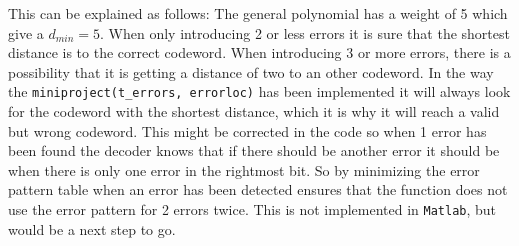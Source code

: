 \documentclass[Main]{subfiles}
\begin{document}
This can be explained as follows:
The general polynomial has a weight of 5 which give a $d_{min}=5$.
When only introducing 2 or less errors it is sure that the shortest distance is to the correct codeword.
When introducing 3 or more errors, there is a possibility that it is getting a distance of two to an other codeword.
In the way the \texttt{miniproject(t\_errors, errorloc)} has been implemented it will always look for the codeword with the shortest distance, which it is why it will reach a valid but wrong codeword.
This might be corrected in the code so when 1 error has been found the decoder knows that if there should be another error it should be when there is only one error in the rightmost bit.
So by minimizing the error pattern table when an error has been detected ensures that the function does not use the error pattern for 2 errors twice.
This is not implemented in \texttt{Matlab}, but would be a next step to go. 
\end{document}
